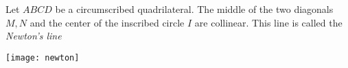\documentclass[12pt]{article}
\begin{document}
Let $ABCD$ be a circumscribed quadrilateral. The middle of the two
diagonals $M,N$ and the center of the inscribed circle $I$ are
collinear. This line is called the \emph{Newton's line}

\begin{center}
\texttt{[image: newton]}
\end{center}
\end{document}
